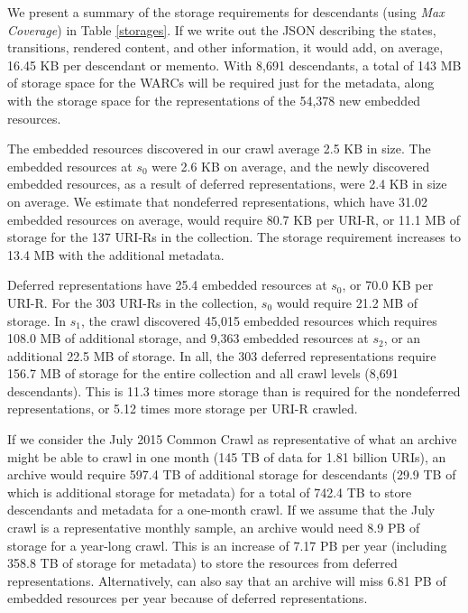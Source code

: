 \documentclass{sig-alternate}
\begin{document}
We present a summary of the storage requirements for descendants (using \emph{Max Coverage}) in Table \ref{storages}. If we write out
the JSON describing the states, transitions, rendered content,
and other information, it would add, on average, 16.45
KB per descendant or memento. With 8,691 descendants, a
total of 143 MB of storage space for the WARCs will be required
just for the metadata, along with the storage space for
the representations of the 54,378 new embedded resources.

The embedded resources discovered in our crawl average
2.5 KB in size. The embedded resources at $s_0$ were 2.6 KB
on average, and the newly discovered embedded resources,
as a result of deferred representations, were 2.4 KB in size
on average. We estimate that nondeferred representations,
which have 31.02 embedded resources on average, would require
80.7 KB per URI-R, or 11.1 MB of storage for the 137
URI-Rs in the collection. The storage requirement increases
to 13.4 MB with the additional metadata.

Deferred representations have 25.4 embedded resources at
$s_0$, or 70.0 KB per URI-R. For the 303 URI-Rs in the collection,
$s_0$ would require 21.2 MB of storage. In $s_1$, the crawl
discovered 45,015 embedded resources which requires 108.0
MB of additional storage, and 9,363 embedded resources
at $s_2$, or an additional 22.5 MB of storage. In all, the
303 deferred representations require 156.7 MB of storage
for the entire collection and all crawl levels (8,691 descendants).
This is 11.3 times more storage than is required for
the nondeferred representations, or 5.12 times more storage
per URI-R crawled.


If we consider the July 2015 Common Crawl \cite{iaSize} as representative
of what an archive might be able to crawl in one
month (145 TB of data for 1.81 billion URIs), an archive
would require 597.4 TB of additional storage for descendants
(29.9 TB of which is additional storage for metadata)
for a total of 742.4 TB to store descendants and metadata
for a one-month crawl. If we assume that the July crawl is a representative monthly sample, an archive would need 8.9 PB of storage for a year-long crawl.  This is an increase of 7.17 PB per year (including 358.8 TB of storage for metadata) to store the resources from deferred representations. 
Alternatively, can also say that an archive
will miss 6.81 PB of embedded resources per year because
of deferred representations.
\end{document}
